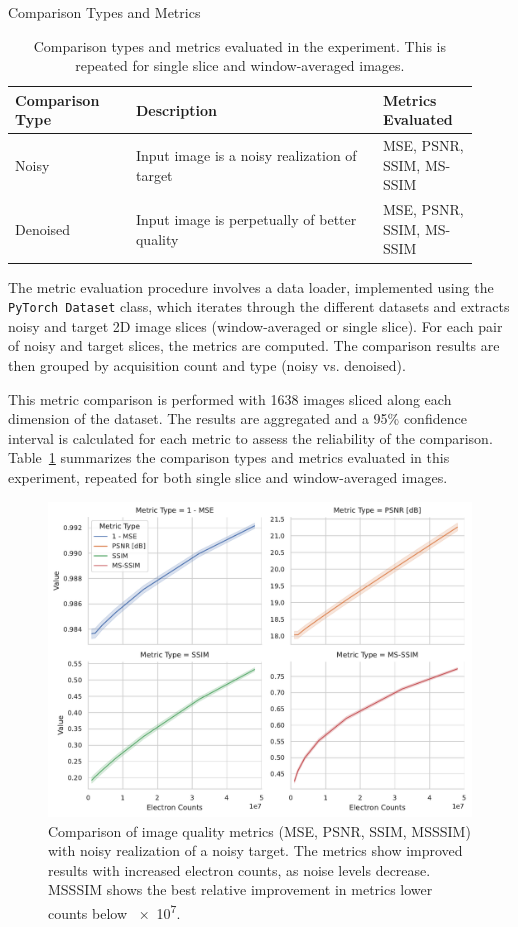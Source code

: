 \begin{table}[h]
    \centering
    \caption{Comparison Types and Metrics}
    \begin{tabular}{p{0.24\linewidth} | p{0.49\linewidth} | p{0.19\linewidth}}
        \hline
        \textbf{Comparison Type} & \textbf{Description} & \textbf{Metrics Evaluated} \\
        \hline
        Noisy & Input image is a noisy realization of target & MSE, PSNR, SSIM, MS-SSIM \\
        \hline
        Denoised & Input image is perpetually of better quality & MSE, PSNR, SSIM, MS-SSIM \\
        \hline
    \end{tabular}
    \caption{Comparison types and metrics evaluated in the experiment. This is repeated for single slice and window-averaged images.}
    \label{tab:comparison_types}
\end{table}

The metric evaluation procedure involves a data loader, implemented using the \texttt{PyTorch Dataset} class, which iterates through the different datasets and extracts noisy and target 2D image slices (window-averaged or single slice). For each pair of noisy and target slices, the metrics are computed. The comparison results are then grouped by acquisition count and type (noisy vs. denoised).

This metric comparison is performed with \num{1638} images sliced along each dimension of the dataset. The results are aggregated and a 95\% confidence interval is calculated for each metric to assess the reliability of the comparison. Table~\ref{tab:comparison_types} summarizes the comparison types and metrics evaluated in this experiment, repeated for both single slice and window-averaged images.


\begin{figure}[h]
    \centering
    \includegraphics[width=0.7\linewidth]{images/metrics_comparison_same_target.pdf}
    \caption{Comparison of image quality metrics (\gls{MSE}, \gls{PSNR}, \gls{SSIM}, \gls{MSSSIM}) with noisy realization of a noisy target. The metrics show improved results with increased electron counts, as noise levels decrease. \gls{MSSSIM} shows the best relative improvement in metrics lower counts below \num{e7}.}
    \label{fig:metrics-comparison-noisy}
\end{figure}

